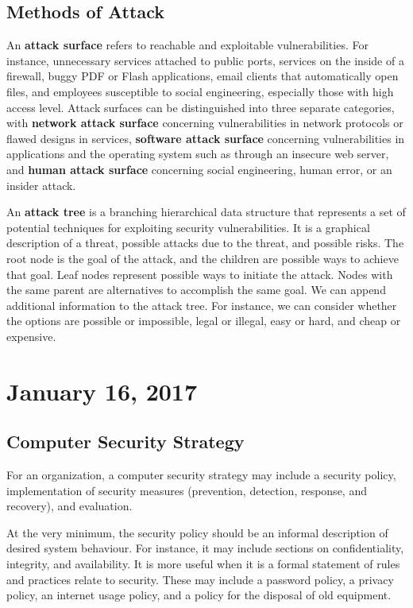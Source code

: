 \documentclass[11pt]{article}
\theoremstyle{plain} %
\theoremstyle{definition}
\theoremstyle{example}
\theoremstyle{remark}
\begin{document}
\subsection{Methods of Attack}

An \textbf{attack surface} refers to reachable and exploitable vulnerabilities. For instance, unnecessary services attached to public ports, services on the inside of a firewall, buggy PDF or Flash applications, email clients that automatically open files, and employees susceptible to social engineering, especially those with high access level. Attack surfaces can be distinguished into three separate categories, with \textbf{network attack surface} concerning vulnerabilities in network protocols or flawed designs in services, \textbf{software attack surface} concerning vulnerabilities in applications and the operating system such as through an insecure web server, and \textbf{human attack surface} concerning social engineering, human error, or an insider attack. 

An \textbf{attack tree} is a branching hierarchical data structure that represents a set of potential techniques for exploiting security vulnerabilities. It is a graphical description
of a threat, possible attacks due to the threat, and possible risks. The root node is the goal of the attack, and the children are possible ways to achieve that goal. Leaf nodes represent possible ways to initiate the attack. Nodes with the same parent are alternatives to accomplish the same goal. We can append additional information to the attack tree. For instance, we can consider whether the options are possible or impossible, legal or illegal, easy or hard, and cheap or expensive. 

\section{January 16, 2017}
\subsection{Computer Security Strategy}

For an organization, a computer security strategy may include a security policy, implementation of security measures (prevention, detection, response, and recovery), and evaluation. 

At the very minimum, the security policy should be an informal description of desired system behaviour. For instance, it may include sections on confidentiality, integrity, and availability. It is more useful when it is a formal statement of rules and practices relate to security. These may include a password policy, a privacy policy, an internet usage policy, and a policy for the disposal of old equipment. 
\end{document}
